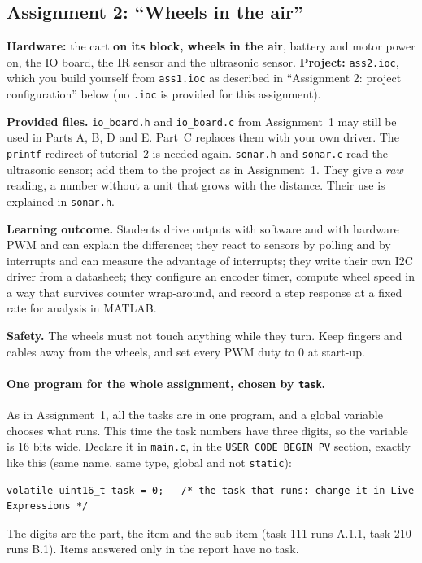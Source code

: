 \documentclass[11pt,a4paper]{article}
\begin{document}
\subsection{Assignment 2: ``Wheels in the air''}

\textbf{Hardware:} the cart \textbf{on its block, wheels in the air}, battery and motor power on, the IO board, the IR
sensor and the ultrasonic sensor.\quad
\textbf{Project:} \texttt{ass2.ioc}, which you build yourself from \texttt{ass1.ioc} as described in ``Assignment 2:
project configuration'' below (no \texttt{.ioc} is provided for this assignment).

\medskip\noindent
\textbf{Provided files.} \texttt{io\_board.h} and \texttt{io\_board.c} from Assignment~1 may still be used in Parts A,
B, D and E. Part~C replaces them with your own driver. The \texttt{printf} redirect of tutorial~2 is needed again.
\texttt{sonar.h} and \texttt{sonar.c} read the ultrasonic sensor; add them to the project as in Assignment~1. They
give a \emph{raw} reading, a number without a unit that grows with the distance. Their use is explained in
\texttt{sonar.h}.

\medskip\noindent
\textbf{Learning outcome.} Students drive outputs with software and with hardware PWM and can explain the difference;
they react to sensors by polling and by interrupts and can measure the advantage of interrupts; they write their own
I2C driver from a datasheet; they configure an encoder timer, compute wheel speed in a way that survives counter
wrap-around, and record a step response at a fixed rate for analysis in MATLAB.

\medskip\noindent
\textbf{Safety.} The wheels must not touch anything while they turn. Keep fingers and cables away from the wheels, and
set every PWM duty to 0 at start-up.

\paragraph{One program for the whole assignment, chosen by \texttt{task}.}
As in Assignment~1, all the tasks are in one program, and a global variable chooses what runs. This time the task
numbers have three digits, so the variable is 16 bits wide. Declare it in \texttt{main.c}, in the
\texttt{USER CODE BEGIN PV} section, exactly like this (same name, same type, global and not \texttt{static}):
\begin{lstlisting}
volatile uint16_t task = 0;   /* the task that runs: change it in Live Expressions */
\end{lstlisting}
The digits are the part, the item and the sub-item (task 111 runs A.1.1, task 210 runs B.1). Items answered only
in the report have no task.
\end{document}
